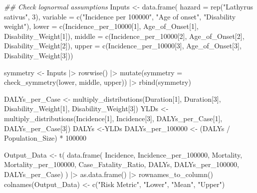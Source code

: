 \documentclass[
  letterpaper,
  DIV=11,
  numbers=noendperiod]{scrartcl}
\newenvironment{Shaded}{\begin{snugshade}}{\end{snugshade}}
\newcommand{\AttributeTok}[1]{\textcolor[rgb]{0.40,0.45,0.13}{#1}}
\newcommand{\DecValTok}[1]{\textcolor[rgb]{0.68,0.00,0.00}{#1}}
\newcommand{\DocumentationTok}[1]{\textcolor[rgb]{0.37,0.37,0.37}{\textit{#1}}}
\newcommand{\FunctionTok}[1]{\textcolor[rgb]{0.28,0.35,0.67}{#1}}
\newcommand{\NormalTok}[1]{\textcolor[rgb]{0.00,0.23,0.31}{#1}}
\newcommand{\OtherTok}[1]{\textcolor[rgb]{0.00,0.23,0.31}{#1}}
\newcommand{\SpecialCharTok}[1]{\textcolor[rgb]{0.37,0.37,0.37}{#1}}
\newcommand{\StringTok}[1]{\textcolor[rgb]{0.13,0.47,0.30}{#1}}
\begin{document}
\begin{Shaded}
\begin{Highlighting}[]
\DocumentationTok{\#\# Check lognormal assumptions}
\NormalTok{Inputs }\OtherTok{\textless{}{-}} \FunctionTok{data.frame}\NormalTok{(}
 \AttributeTok{hazard =} \FunctionTok{rep}\NormalTok{(}\StringTok{"Lathyrus sativus"}\NormalTok{,  }\DecValTok{3}\NormalTok{), }
 \AttributeTok{variable =} \FunctionTok{c}\NormalTok{(}\StringTok{"Incidence per 100000"}\NormalTok{,  }\StringTok{"Age of onset"}\NormalTok{,  }\StringTok{"Disability weight"}\NormalTok{), }
 \AttributeTok{lower =} \FunctionTok{c}\NormalTok{(Incidence\_per\_10000[}\DecValTok{1}\NormalTok{],  Age\_of\_Onset[}\DecValTok{1}\NormalTok{],  Disability\_Weight[}\DecValTok{1}\NormalTok{]), }
 \AttributeTok{middle =} \FunctionTok{c}\NormalTok{(Incidence\_per\_10000[}\DecValTok{2}\NormalTok{],  Age\_of\_Onset[}\DecValTok{2}\NormalTok{],  Disability\_Weight[}\DecValTok{2}\NormalTok{]), }
 \AttributeTok{upper =} \FunctionTok{c}\NormalTok{(Incidence\_per\_10000[}\DecValTok{3}\NormalTok{],  Age\_of\_Onset[}\DecValTok{3}\NormalTok{],  Disability\_Weight[}\DecValTok{3}\NormalTok{]))}

\NormalTok{symmetry }\OtherTok{\textless{}{-}}\NormalTok{ Inputs }\SpecialCharTok{|\textgreater{}}
 \FunctionTok{rowwise}\NormalTok{() }\SpecialCharTok{|\textgreater{}}
 \FunctionTok{mutate}\NormalTok{(}\AttributeTok{symmetry =} \FunctionTok{check\_symmetry}\NormalTok{(lower,  middle,  upper)) }\SpecialCharTok{|\textgreater{}} 
 \FunctionTok{rbind}\NormalTok{(symmetry)}

\NormalTok{DALYs\_per\_Case }\OtherTok{\textless{}{-}} \FunctionTok{multiply\_distributions}\NormalTok{(Duration[}\DecValTok{1}\NormalTok{],  Duration[}\DecValTok{3}\NormalTok{],  Disability\_Weight[}\DecValTok{1}\NormalTok{],  Disability\_Weight[}\DecValTok{3}\NormalTok{])}
\NormalTok{YLDs }\OtherTok{\textless{}{-}} \FunctionTok{multiply\_distributions}\NormalTok{(Incidence[}\DecValTok{1}\NormalTok{], Incidence[}\DecValTok{3}\NormalTok{],  DALYs\_per\_Case[}\DecValTok{1}\NormalTok{],  DALYs\_per\_Case[}\DecValTok{3}\NormalTok{])}
\NormalTok{DALYs }\OtherTok{\textless{}{-}}\NormalTok{YLDs}
\NormalTok{DALYs\_per\_100000 }\OtherTok{\textless{}{-}}\NormalTok{ (DALYs }\SpecialCharTok{/}\NormalTok{ Population\_Size) }\SpecialCharTok{*} \DecValTok{100000}

\NormalTok{Output\_Data }\OtherTok{\textless{}{-}} \FunctionTok{t}\NormalTok{(}
 \FunctionTok{data.frame}\NormalTok{(}
\NormalTok{ Incidence,  Incidence\_per\_100000, }
\NormalTok{ Mortality,  Mortality\_per\_100000, }
\NormalTok{ Case\_Fatality\_Ratio, }
\NormalTok{ DALYs,  DALYs\_per\_100000,  DALYs\_per\_Case)}
\NormalTok{ ) }\SpecialCharTok{|\textgreater{}} 
 \FunctionTok{as.data.frame}\NormalTok{() }\SpecialCharTok{|\textgreater{}} 
 \FunctionTok{rownames\_to\_column}\NormalTok{()}
\FunctionTok{colnames}\NormalTok{(Output\_Data) }\OtherTok{\textless{}{-}} \FunctionTok{c}\NormalTok{(}\StringTok{"Risk Metric"}\NormalTok{,  }\StringTok{"Lower"}\NormalTok{,  }\StringTok{"Mean"}\NormalTok{,  }\StringTok{"Upper"}\NormalTok{)}


\end{Highlighting}
\end{Shaded}
\end{document}
